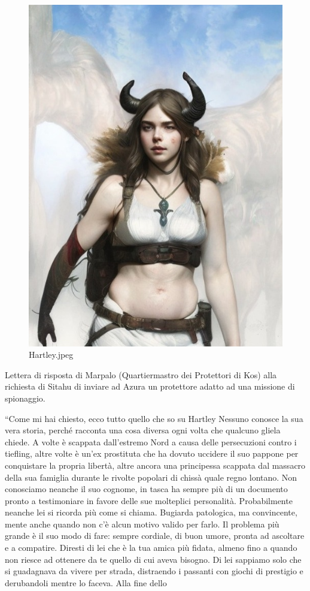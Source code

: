 \begin{figure}
\centering
\includegraphics{Hartley.jpeg}
\caption{Hartley.jpeg}
\end{figure}

Lettera di risposta di Marpalo (Quartiermastro dei Protettori di Kos)
alla richiesta di Sitahu di inviare ad Azura un protettore adatto ad una
missione di spionaggio.

``Come mi hai chiesto, ecco tutto quello che so su Hartley Nessuno
conosce la sua vera storia, perché racconta una cosa diversa ogni volta
che qualcuno gliela chiede. A volte è scappata dall'estremo Nord a causa
delle persecuzioni contro i tiefling, altre volte è un'ex prostituta che
ha dovuto uccidere il suo pappone per conquistare la propria libertà,
altre ancora una principessa scappata dal massacro della sua famiglia
durante le rivolte popolari di chissà quale regno lontano. Non
conosciamo neanche il suo cognome, in tasca ha sempre più di un
documento pronto a testimoniare in favore delle sue molteplici
personalità. Probabilmente neanche lei si ricorda più come si chiama.
Bugiarda patologica, ma convincente, mente anche quando non c'è alcun
motivo valido per farlo. Il problema più grande è il suo modo di fare:
sempre cordiale, di buon umore, pronta ad ascoltare e a compatire.
Diresti di lei che è la tua amica più fidata, almeno fino a quando non
riesce ad ottenere da te quello di cui aveva bisogno. Di lei sappiamo
solo che si guadagnava da vivere per strada, distraendo i passanti con
giochi di prestigio e derubandoli mentre lo faceva. Alla fine dello
